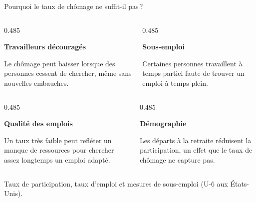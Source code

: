 \documentclass[aspectratio=169]{beamer}
\begin{document}
\begin{frame}[t]{Pourquoi le taux de chômage ne suffit-il pas\,?}\examtag
   \vspace{0.16cm}
   \small

   \begin{columns}[T,onlytextwidth]
      \begin{column}{0.485\textwidth}
         \begin{tcolorbox}[limiteemploi]
            \textbf{\textcolor{HECnavy}{Travailleurs découragés}}\par\smallskip
            Le chômage peut baisser lorsque des personnes cessent de chercher, même sans nouvelles embauches.
         \end{tcolorbox}
      \end{column}
      \begin{column}{0.485\textwidth}
         \begin{tcolorbox}[limiteemploi]
            \textbf{\textcolor{HECnavy}{Sous-emploi}}\par\smallskip
            Certaines personnes travaillent à temps partiel faute de trouver un emploi à temps plein.
         \end{tcolorbox}
      \end{column}
   \end{columns}
   \vspace{0.13cm}
   \begin{columns}[T,onlytextwidth]
      \begin{column}{0.485\textwidth}
         \begin{tcolorbox}[limiteemploi]
            \textbf{\textcolor{HECnavy}{Qualité des emplois}}\par\smallskip
            Un taux très faible peut refléter un manque de ressources pour chercher assez longtemps un emploi adapté.
         \end{tcolorbox}
      \end{column}
      \begin{column}{0.485\textwidth}
         \begin{tcolorbox}[limiteemploi]
            \textbf{\textcolor{HECnavy}{Démographie}}\par\smallskip
            Les départs à la retraite réduisent la participation, un effet que le taux de chômage ne capture pas.
         \end{tcolorbox}
      \end{column}
   \end{columns}

   \vspace{0.08cm}
   \begin{warning}
      \footnotesize\RaggedRight
      Taux de participation, taux d'emploi et mesures de sous-emploi (U-6 aux États-Unis).
   \end{warning}
\end{frame}
\end{document}
